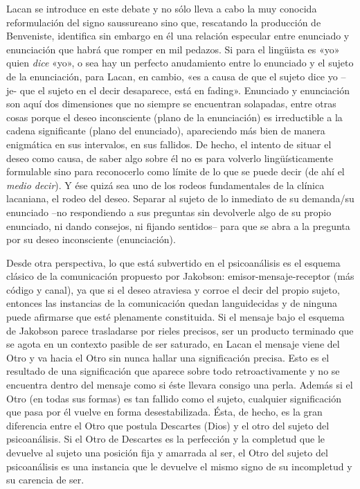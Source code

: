 Lacan se introduce en este debate y no sólo lleva a cabo la muy conocida reformulación del signo saussureano sino que, rescatando la producción de Benveniste, identifica sin embargo en él una relación especular entre enunciado y enunciación que habrá que romper en mil pedazos. Si para el lingüista es «yo» quien \emph{dice} «yo», o sea hay un perfecto anudamiento entre lo enunciado y el sujeto de la enunciación, para Lacan, en cambio, «es a causa de que el sujeto dice yo --je- que el sujeto en el decir desaparece, está en fading». Enunciado y enunciación son aquí dos dimensiones que no siempre se encuentran solapadas, entre otras cosas porque el deseo inconsciente (plano de la enunciación) es irreductible a la cadena significante (plano del enunciado), apareciendo más bien de manera enigmática en sus intervalos, en sus fallidos. De hecho, el intento de situar el deseo como causa, de saber algo sobre él no es para volverlo lingüísticamente formulable sino para reconocerlo como límite de lo que se puede decir (de ahí el \emph{medio decir}). Y ése quizá sea uno de los rodeos fundamentales de la clínica lacaniana, el rodeo del deseo. Separar al sujeto de lo inmediato de su demanda/su enunciado --no respondiendo a sus preguntas sin devolverle algo de su propio enunciado, ni dando consejos, ni fijando sentidos-- para que se abra a la pregunta por su deseo inconsciente (enunciación).

Desde otra perspectiva, lo que está subvertido en el psicoanálisis es el esquema clásico de la comunicación propuesto por Jakobson: emisor-mensaje-receptor (más código y canal), ya que si el deseo atraviesa y corroe el decir del propio sujeto, entonces las instancias de la comunicación quedan languidecidas y de ninguna puede afirmarse que esté plenamente constituida. Si el mensaje bajo el esquema de Jakobson parece trasladarse por rieles precisos, ser un producto terminado que se agota en un contexto pasible de ser saturado, en Lacan el mensaje viene del Otro y va hacia el Otro sin nunca hallar una significación precisa. Esto es el resultado de una significación que aparece sobre todo retroactivamente y no se encuentra dentro del mensaje como si éste llevara consigo una perla. Además si el Otro (en todas sus formas) es tan fallido como el sujeto, cualquier significación que pasa por él vuelve en forma desestabilizada. Ésta, de hecho, es la gran diferencia entre el Otro que postula Descartes (Dios) y el otro del sujeto del psicoanálisis. Si el Otro de Descartes es la perfección y la completud que le devuelve al sujeto una posición fija y amarrada al ser, el Otro del sujeto del psicoanálisis es una instancia que le devuelve el mismo signo de su incompletud y su carencia de ser.

